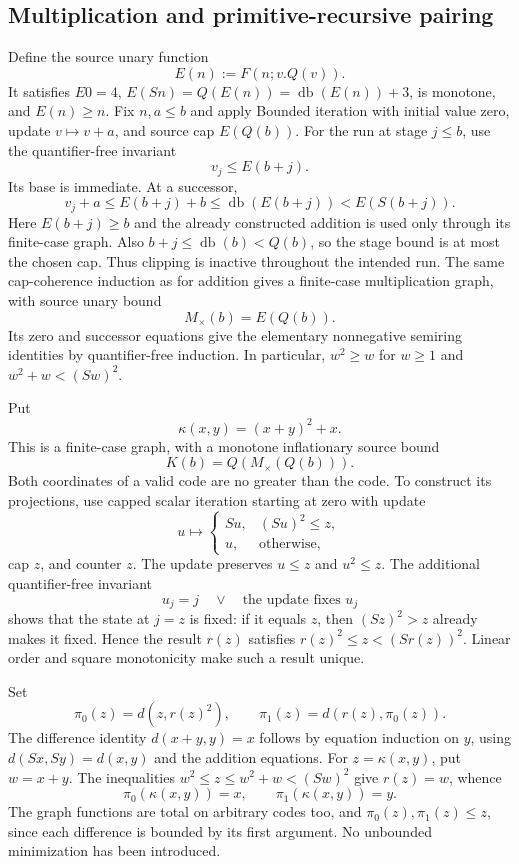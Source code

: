 \subsection{Multiplication and primitive-recursive pairing}
Define the source unary function
\[
 E(n):=F(n;v.Q(v)).
\]
It satisfies $E0=4$, $E(Sn)=Q(E(n))=\operatorname{db}(E(n))+3$,
is monotone, and $E(n)\ge n$. Fix $n,a\le b$ and apply Bounded
iteration with initial value zero, update $v\mapsto v+a$, and
source cap $E(Q(b))$. For the run at stage $j\le b$, use the
quantifier-free invariant
\[
                         v_j\le E(b+j).
\]
Its base is immediate. At a successor,
\[
 v_j+a\le E(b+j)+b
          \le\operatorname{db}(E(b+j))<E(S(b+j)).
\]
Here $E(b+j)\ge b$ and the already constructed addition is used
only through its finite-case graph. Also
$b+j\le\operatorname{db}(b)<Q(b)$, so the stage bound is at most
the chosen cap. Thus clipping is inactive throughout the intended run.
The same cap-coherence induction as for addition gives a finite-case
multiplication graph, with source unary bound
\[
                         M_\times(b)=E(Q(b)).
\]
Its zero and successor equations give the elementary nonnegative
semiring identities by quantifier-free induction. In particular,
$w^2\ge w$ for $w\ge1$ and
$w^2+w<(Sw)^2$.

Put
\[
                         \kappa(x,y)=(x+y)^2+x.
\]
This is a finite-case graph, with a monotone inflationary source bound
\[
                  K(b)=Q(M_\times(Q(b))).
\]
Both coordinates of a valid code are no greater than the code.
To construct its projections, use capped scalar iteration starting
at zero with update
\[
 u\longmapsto\begin{cases}Su,&(Su)^2\le z,\\u,&\text{otherwise},\end{cases}
\]
cap $z$, and counter $z$. The update preserves $u\le z$ and
$u^2\le z$. The additional quantifier-free invariant
\[
               u_j=j\quad\lor\quad\text{the update fixes }u_j
\]
shows that the state at $j=z$ is fixed: if it equals $z$, then
$(Sz)^2>z$ already makes it fixed. Hence the result $r(z)$ satisfies
$r(z)^2\le z<(Sr(z))^2$. Linear order and square monotonicity make
such a result unique.

Set
\[
 \pi_0(z)=d(z,r(z)^2),\qquad \pi_1(z)=d(r(z),\pi_0(z)).
\]
The difference identity $d(x+y,y)=x$ follows by equation induction
on $y$, using $d(Sx,Sy)=d(x,y)$ and the addition equations.
For $z=\kappa(x,y)$, put $w=x+y$. The inequalities
$w^2\le z\le w^2+w<(Sw)^2$ give $r(z)=w$, whence
\[
               \pi_0(\kappa(x,y))=x,\qquad
               \pi_1(\kappa(x,y))=y.
\]
The graph functions are total on arbitrary codes too, and
$\pi_0(z),\pi_1(z)\le z$, since each difference is bounded by
its first argument. No unbounded minimization has been introduced.

